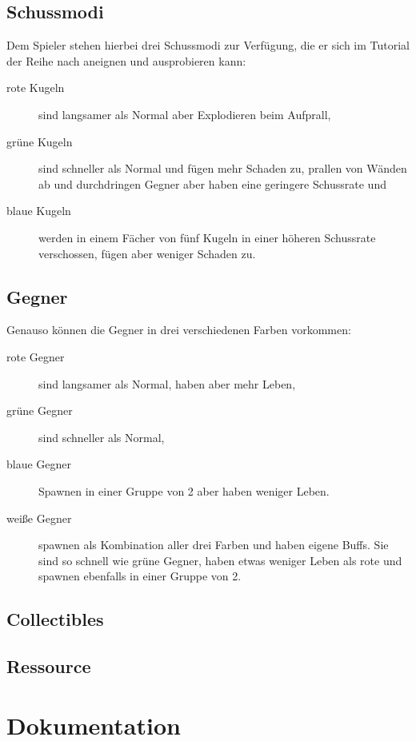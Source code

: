 \documentclass[a4paper,10pt,ngerman,fontsize=12pt]{scrreprt}
\begin{document}
\section{Schussmodi}
Dem Spieler stehen hierbei drei Schussmodi zur Verfügung, die er sich im Tutorial der Reihe nach aneignen und ausprobieren kann:
\begin{description}
\item[rote Kugeln] sind langsamer als Normal aber Explodieren beim Aufprall,
\item[grüne Kugeln] sind schneller als Normal und fügen mehr Schaden zu, prallen von Wänden ab und durchdringen Gegner aber haben eine geringere Schussrate und
\item[blaue Kugeln] werden in einem Fächer von fünf Kugeln in einer höheren Schussrate verschossen, fügen aber weniger Schaden zu.
\end{description}




\section{Gegner}
Genauso können die Gegner in drei verschiedenen Farben vorkommen:
\begin{description}
\item[rote Gegner] sind langsamer als Normal, haben aber mehr Leben,
\item[grüne Gegner] sind schneller als Normal,
\item[blaue Gegner] Spawnen in einer Gruppe von 2 aber haben weniger Leben.
\item[weiße Gegner] spawnen als Kombination aller drei Farben und haben eigene Buffs. Sie sind so schnell wie grüne Gegner, haben etwas weniger Leben als rote und spawnen ebenfalls in einer Gruppe von 2.
\end{description}




\section{Collectibles}




\section{Ressource}





\chapter{Dokumentation}
\lipsum[3]
\end{document}
